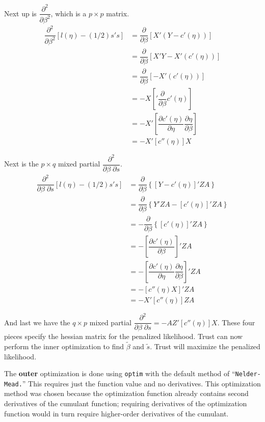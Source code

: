 \documentclass{article}
\begin{document}
Next up is  $ \dfrac{\partial^2}{\partial \beta^2}$, which is a $p \times p$ matrix.
\begin{align}
  \dfrac{\partial^2}{\partial \beta^2}  \left[ l(\eta) - (1/2) s's   \right] &=   \dfrac{\partial}{\partial \beta} \left[ X' (Y-c'(\eta))  \right]\\
&= \dfrac{\partial}{\partial \beta} \left[ X' Y-X'(c'(\eta))  \right] \\
&= \dfrac{\partial}{\partial \beta} \left[ -X'(c'(\eta))  \right] \\
&=-X  \left[' \dfrac{\partial}{\partial \beta} c'(\eta)  \right] \\
&=-X'  \left[ \dfrac{\partial  c'(\eta)}{\partial \eta} \dfrac{\partial \eta}{\partial \beta}  \right] \\
&=-X'  \left[ c''(\eta)\right]  X   
\end{align}

Next is the $p \times q$ mixed partial $\dfrac{\partial^2}{  \partial \beta \; \partial s}$.
\begin{align}
\dfrac{\partial^2}{ \partial \beta \;  \partial s}  \left[ l(\eta) - (1/2) s's   \right] &= \dfrac{\partial}{\partial \beta} \left\{  \left[ Y-c'(\eta)  \right]' ZA  \right\}\\
&= \dfrac{\partial}{\partial \beta} \left\{Y'ZA-  \left[ c'(\eta)  \right]' ZA  \right\} \\
&=- \dfrac{\partial}{\partial \beta} \left\{  \left[ c'(\eta)  \right]' ZA  \right\} \\
&=- \left[  \dfrac{\partial  c'(\eta)}{\partial \beta}  \right]' ZA  \\
&=-   \left[  \dfrac{\partial  c'(\eta)}{\partial \eta} \dfrac{\partial \eta}{\partial \beta}  \right]' ZA   \\
&=-   \left[ c''(\eta) X  \right]' ZA   \\
&=-X'   \left[ c''(\eta)   \right] ZA  
\end{align}


And last we have the $q \times p$ mixed partial $\dfrac{\partial^2}{  \partial \beta \; \partial s}= -AZ' [c''(\eta)] X.$  These four pieces specify the hessian matrix for the penalized likelihood. Trust can now perform the inner optimization to find $\tilde{\beta}$ and $\tilde{s}$. Trust will maximize the penalized likelihood.





The {\bf outer} optimization is done using \texttt{optim} with the default method of ``\texttt{Nelder-Mead.}'' This requires just the function value and no derivatives.  This optimization method was chosen because the optimization function already contains second derivatives of the cumulant function; requiring derivatives of the optimization function would in turn require higher-order derivatives of the cumulant.  
\end{document}
